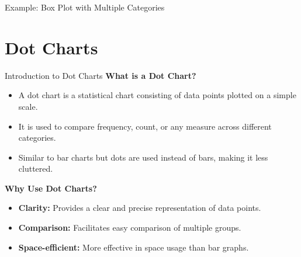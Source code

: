 \documentclass[handout]{beamer} %
\begin{document}
\begin{frame}{Example: Box Plot with Multiple Categories}
\centering

\end{frame}

\section{Dot Charts}

\begin{frame}{Introduction to Dot Charts}
    \textbf{What is a Dot Chart?}
    \begin{itemize}
        \item A dot chart is a statistical chart consisting of data points plotted on a simple scale.
        \item It is used to compare frequency, count, or any measure across different categories.
        \item Similar to bar charts but dots are used instead of bars, making it less cluttered.
    \end{itemize}
    \textbf{Why Use Dot Charts?}
    \begin{itemize}
        \item \textbf{Clarity:} Provides a clear and precise representation of data points.
        \item \textbf{Comparison:} Facilitates easy comparison of multiple groups.
        \item \textbf{Space-efficient:} More effective in space usage than bar graphs.
    \end{itemize}
\end{frame}
\end{document}
